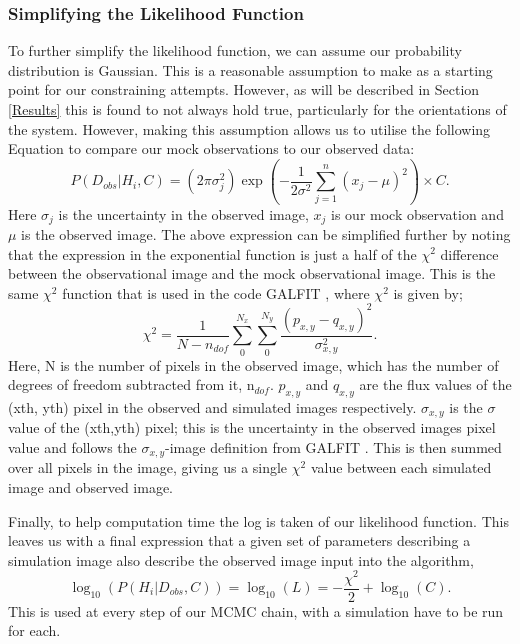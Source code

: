 \subsubsection{Simplifying the Likelihood Function}
To further simplify the likelihood function, we can assume our probability distribution is Gaussian. This is a reasonable assumption to make as a starting point for our constraining attempts. However, as will be described in Section \ref{Results} this is found to not always hold true, particularly for the orientations of the system. However, making this assumption allows us to utilise the following Equation to compare our mock observations to our observed data:
\begin{equation}\label{like_gauss}
P(D_{obs}|H_{i},C) = (2\pi\sigma^{2}_{j})\exp(-\frac{1}{2\sigma^{2}}\sum_{j=1}^{n}(x_{j}-\mu)^{2}) \times C.
\end{equation}
Here $\sigma_{j}$ is the uncertainty in the observed image, $x_{j}$ is our mock observation and $\mu$ is the observed image. The above expression can be simplified further by noting that the expression in the exponential function is just a half of the $\chi^{2}$ difference between the observational image and the mock observational image. This is the same $\chi^{2}$ function that is used in the code GALFIT \citep{2002AJ....124..266P}, where $\chi^{2}$ is given by;
\begin{equation}\label{chi_squared}
\chi^{2} = \frac{1}{N - n_{dof}}\sum_{0}^{N_{x}}\sum_{0}^{N_{y}}\frac{(p_{x,y} - q_{x,y})^{2}}{\sigma_{x,y}^{2}}.
\end{equation}
Here, N is the number of pixels in the observed image, which has the number of degrees of freedom subtracted from it, n$_{dof}$. $p_{x,y}$ and $q_{x,y}$ are the flux values of the (xth, yth) pixel in the observed and simulated images respectively. $\sigma_{x,y}$ is the $\sigma$ value of the (xth,yth) pixel; this is the uncertainty in the observed images pixel value and follows the $\sigma_{x,y}$-image definition from GALFIT \citep{2002AJ....124..266P,2010AJ....139.2097P}. This is then summed over all pixels in the image, giving us a single $\chi^{2}$ value between each simulated image and observed image.

Finally, to help computation time the log is taken of our likelihood function. This leaves us with a final expression that a given set of parameters describing a simulation image also describe the observed image input into the algorithm,
\begin{equation}\label{likelihood}
\log_{10}(P(H_{i}|D_{obs},C)) = \log_{10}(L) = - \frac{\chi^{2}}{2} + \log_{10}(C).
\end{equation}
This is used at every step of our MCMC chain, with a simulation have to be run for each.

